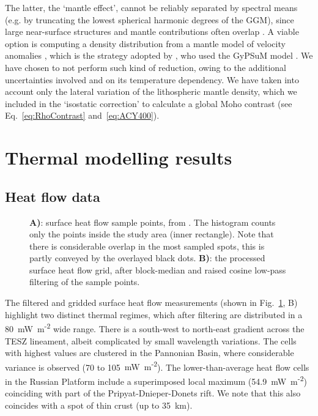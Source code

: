 {The latter, the `mantle effect', cannot be reliably separated by spectral means (e.g. by truncating the lowest spherical harmonic degrees of the GGM), since large near-surface structures and mantle contributions often overlap \parencite{Kaban2004}.
A viable option is computing a density distribution from a mantle model of velocity anomalies \parencite[e.g. ][]{Kuhn2005}, which is the strategy adopted by \textcite{Reguzzoni2015}, who used the GyPSuM model \parencite{Simmons2010}.
We have chosen to not perform such kind of reduction, owing to the additional uncertainties involved and on its temperature dependency.
We have taken into account only the lateral variation of the lithospheric mantle density, which we included in the `isostatic correction' to calculate a global Moho contrast (see Eq.~\ref{eq:RhoContrast} and~\ref{eq:ACY400}).

\section{Thermal modelling results}
\label{s:Appl:DiscTherm}

\subsection{Heat flow data}
\label{ss:Appl:DiscTherm:HF}

\begin{figure}
	\begin{adjustbox}{center}
	\end{adjustbox}
	\caption{\textbf{A)}: surface heat flow sample points, from \textcite{globalHF}. The histogram counts only the points inside the study area (inner rectangle). Note that there is considerable overlap in the most sampled spots, this is partly conveyed by the overlayed black dots. \textbf{B)}: the processed surface heat flow grid, after block-median and raised cosine low-pass filtering of the sample points.}
	\label{fig:HFdata}
\end{figure}

The filtered and gridded surface heat flow measurements (shown in Fig.~\ref{fig:HFdata}, B) highlight two distinct thermal regimes, which after filtering are distributed in a 80~{mW~m\textsuperscript{-2}} wide range.
There is a south-west to north-east gradient across the TESZ lineament, albeit complicated by small wavelength variations.
The cells with highest values are clustered in the Pannonian Basin, where considerable variance is observed (70 to 105~{mW~m\textsuperscript{-2}}).
The lower-than-average heat flow cells in the Russian Platform include a superimposed local maximum (54.9~{mW~m\textsuperscript{-2}}) coinciding with part of the Pripyat-Dnieper-Donets rift.
We note that this also coincides with a spot of thin crust (up to 35~km).

}
